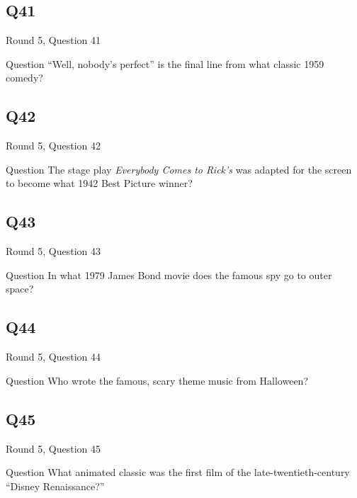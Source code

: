 \documentclass[11pt]{beamer}
\begin{document}
\subsection*{Q41}
\begin{frame}[t]{Round 5, Question 41}
  \vspace{2em}
  \begin{block}{Question}
    ``Well, nobody's perfect'' is the final line from what classic 1959 comedy?
  \end{block}
\end{frame}


\subsection*{Q42}
\begin{frame}[t]{Round 5, Question 42}
  \vspace{2em}
  \begin{block}{Question}
    The stage play \emph{Everybody Comes to Rick's} was adapted for the screen to become what 1942 Best Picture winner?
  \end{block}
\end{frame}


\subsection*{Q43}
\begin{frame}[t]{Round 5, Question 43}
  \vspace{2em}
  \begin{block}{Question}
    In what 1979 James Bond movie does the famous spy go to outer space?
  \end{block}
\end{frame}


\subsection*{Q44}
\begin{frame}[t]{Round 5, Question 44}
  \vspace{2em}
  \begin{block}{Question}
    Who wrote the famous, scary theme music from Halloween?
  \end{block}
\end{frame}


\subsection*{Q45}
\begin{frame}[t]{Round 5, Question 45}
  \vspace{2em}
  \begin{block}{Question}
    What animated classic was the first film of the late-twentieth-century ``Disney Renaissance?''
  \end{block}
\end{frame}
\end{document}
